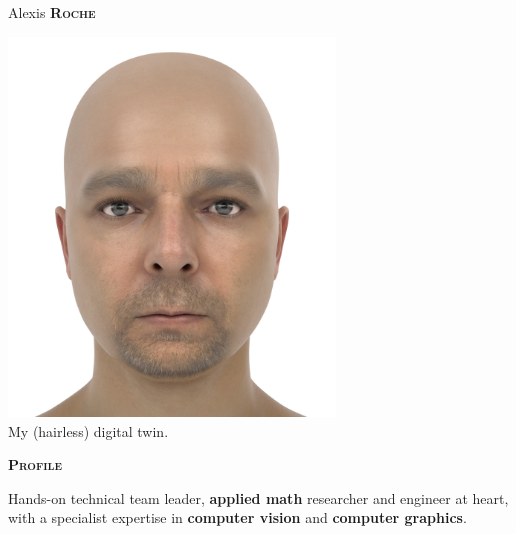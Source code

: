 \documentclass[11pt, a4paper]{article}
\newcommand{\headleft}[1]{\vspace*{3ex}\textsc{\textbf{#1}}\par%
    \vspace*{-1.5ex}\hrulefill\par\vspace*{0.7ex}}
\begin{document}
\setlength{\topskip}{0pt}
\setlength{\parindent}{0pt}
\setlength{\parskip}{0pt}
\setlength{\fboxsep}{0pt}
\pagestyle{empty}
\raggedbottom

\begin{minipage}[t]{0.33\textwidth} %
\colorbox{cvblue}{\begin{minipage}[t][5mm][t]{\textwidth}\null\hfill\null\end{minipage}}

\vspace{-.2ex} %
\colorbox{cvblue!90}{\color{white}  %
\textwidth\relax%
\begin{minipage}[t][293mm][t]{0.82\textwidth}
\raggedright
\vspace*{2.5ex}

\Large Alexis \textbf{\textsc{Roche}} \normalsize 

\null\hfill
\begin{center}
  \includegraphics[width=0.65\textwidth]{alexis_didimo_cropped.png}\\
  {\scriptsize My (hairless) digital twin.}
\end{center}
\hfill\null

\vspace*{0.5ex} %

\headleft{Profile}
 Hands-on technical team leader, {\bf applied math} researcher and engineer at heart, with a specialist expertise in {\bf computer vision} and {\bf computer graphics}. 


\end{minipage}}
\end{minipage}
\end{document}
